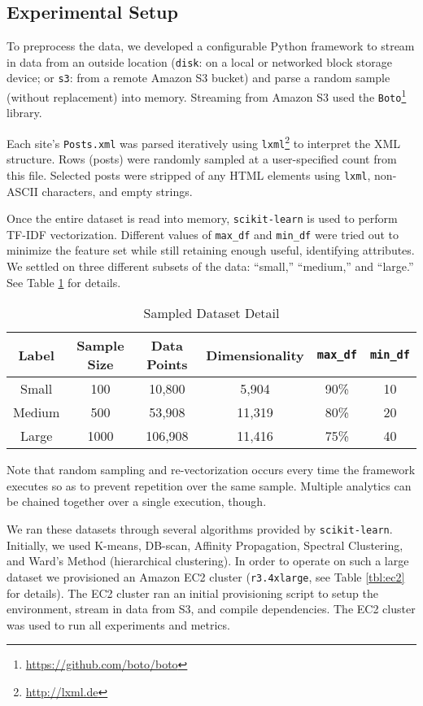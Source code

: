 \documentclass[letterpaper,10pt]{article}
\begin{document}
\subsection{Experimental Setup}

To preprocess the data, we developed a configurable Python framework to
stream in data from an outside location (\texttt{disk}: on a local or
networked block storage device; or \texttt{s3}: from a remote Amazon S3
bucket) and parse a random sample (without replacement) into memory.
Streaming from Amazon S3 used the
\texttt{Boto}\footnote{\url{https://github.com/boto/boto}} library.

Each site's \texttt{Posts.xml} was parsed iteratively using
\texttt{lxml}\footnote{\url{http://lxml.de}} to interpret the XML
structure. Rows (posts) were randomly sampled at a user-specified count
from this file. Selected posts were stripped of any HTML elements using
\texttt{lxml}, non-ASCII characters, and empty strings.

Once the entire dataset is read into memory, \texttt{scikit-learn} is used
to perform TF-IDF vectorization. Different values of \texttt{max\_df} and
\texttt{min\_df} were tried out to minimize the feature set while still
retaining enough useful, identifying attributes. We settled on three
different subsets of the data: ``small,'' ``medium,'' and ``large.'' See
Table \ref{tbl:tfidf} for details.


\begin{table}[ht]
\center
\begin{tabular}{cccccc}
Label & Sample Size & Data Points & Dimensionality & \texttt{max\_df} &
\texttt{min\_df} \\
\hline
Small & 100 & 10,800 & 5,904 & 90\% & 10 \\
Medium & 500 & 53,908 & 11,319 & 80\% & 20 \\
Large & 1000 & 106,908 & 11,416 & 75\% & 40 \\
\hline
\end{tabular}
\caption{Sampled Dataset Detail}
\label{tbl:tfidf}
\end{table}


\noindent
Note that random sampling and re-vectorization occurs every time the
framework executes so as to prevent repetition over the same sample.
Multiple analytics can be chained together over a single execution, though.

We ran these datasets through several algorithms provided by
\texttt{scikit-learn}. Initially, we used K-means, DB-scan, Affinity
Propagation, Spectral Clustering, and Ward's Method (hierarchical
clustering). In order to operate on such a large dataset we provisioned an
Amazon EC2 cluster (\texttt{r3.4xlarge}, see Table \ref{tbl:ec2} for
details). The EC2 cluster ran an initial provisioning script to setup the
environment, stream in data from S3, and compile dependencies. The EC2
cluster was used to run all experiments and metrics.
\end{document}
